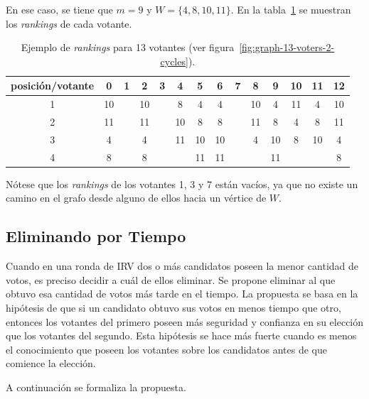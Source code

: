 En ese caso, se tiene que $m = 9$ y $W = \{ 4, 8, 10, 11 \}$. En la tabla~\ref{tab:rankings-13-voters} se muestran los \textit{rankings} de cada votante.

\begin{table}[h!]
    \centering
    \begin{tabular}{|c|c|c|c|c|c|c|c|c|c|c|c|c|c|}
        \hline
        posici\'on/votante & 0  & 1  & 2  & 3  & 4  & 5  & 6  & 7  & 8  & 9  & 10 & 11 & 12 \\ \hline
        1                  & 10 &    & 10 &    & 8  & 4  & 4  &    & 10 & 4  & 11 & 4  & 10 \\ \hline
        2                  & 11 &    & 11 &    & 10 & 8  & 8  &    & 11 & 8  & 4  & 8  & 11 \\ \hline
        3                  & 4  &    & 4  &    & 11 & 10 & 10 &    & 4  & 10 & 8  & 10 & 4  \\ \hline
        4                  & 8  &    & 8  &    &    & 11 & 11 &    &    & 11 &    &    & 8  \\ \hline
    \end{tabular}
    \caption{Ejemplo de \textit{rankings} para 13 votantes (ver figura~\ref{fig:graph-13-voters-2-cycles}).}
    \label{tab:rankings-13-voters}
\end{table}

N\'otese que los \textit{rankings}  de los votantes 1, 3 y 7 est\'an vac\'ios, ya que no existe un camino en el grafo desde alguno de ellos hacia un v\'ertice de $W$.

\subsection{Eliminando por Tiempo}
Cuando en una ronda de IRV dos o m\'as candidatos poseen la menor cantidad de votos, es preciso decidir a cu\'al de ellos eliminar. Se propone eliminar al que obtuvo esa cantidad de votos m\'as tarde en el tiempo. La propuesta se basa en la hip\'otesis de que si un candidato obtuvo sus votos en menos tiempo que otro, entonces los votantes del primero poseen m\'as seguridad y confianza en su elecci\'on que los votantes del segundo. Esta hip\'otesis se hace m\'as fuerte cuando es menos el conocimiento que poseen los votantes sobre los candidatos antes de que comience la elecci\'on. 

A continuaci\'on se formaliza la propuesta.


